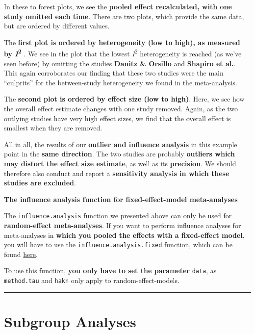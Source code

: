 \documentclass[]{book}
\begin{document}
In these to forest plots, we see the \textbf{pooled effect recalculated, with one study omitted each time}. There are two plots, which provide the same data, but are ordered by different values.

The \textbf{first plot is ordered by heterogeneity (low to high), as measured by \emph{I}\textsuperscript{2} }. We see in the plot that the lowest \emph{I}\textsuperscript{2} heterogeneity is reached (as we've seen before) by omitting the studies \textbf{Danitz \& Orsillo} and \textbf{Shapiro et al.}. This again corroborates our finding that these two studies were the main ``culprits'' for the between-study heterogeneity we found in the meta-analysis.

The \textbf{second plot is ordered by effect size (low to high)}. Here, we see how the overall effect estimate changes with one study removed. Again, as the two outlying studies have very high effect sizes, we find that the overall effect is smallest when they are removed.

All in all, the results of our \textbf{outlier and influence analysis} in this example point in the \textbf{same direction}. The two studies are probably \textbf{outliers which may distort the effect size estimate}, as well as its \textbf{precision}. We should therefore also conduct and report a \textbf{sensitivity analysis in which these studies are excluded}.

\begin{rmdachtung}
\textbf{The influence analysis function for fixed-effect-model
meta-analyses}

The \texttt{influence.analysis} function we presented above can only be
used for \textbf{random-effect meta-analyses}. If you want to perform
influence analyses for meta-analyses in \textbf{which you pooled the
effects with a fixed-effect model}, you will have to use the
\texttt{influence.analysis.fixed} function, which can be found
\href{https://github.com/MathiasHarrer/Doing-Meta-Analysis-in-R/blob/master/influence_analysis_function_for_fixed_effect_model.R}{here}.

To use this function, \textbf{you only have to set the parameter}
\texttt{data}, as \texttt{method.tau} and \texttt{hakn} only apply to
random-effect-models.
\end{rmdachtung}

\begin{center}\rule{0.5\linewidth}{\linethickness}\end{center}

\hypertarget{subgroup}{%
\chapter{Subgroup Analyses}\label{subgroup}}
\end{document}
